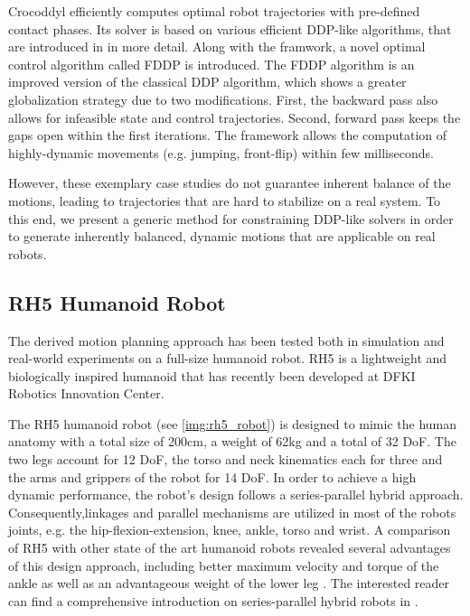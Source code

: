 Crocoddyl efficiently computes optimal robot trajectories with pre-defined contact phases. Its solver is based on various efficient \gls{DDP}-like algorithms, that are introduced in  in more detail. Along with the framwork, a novel optimal control algorithm called \gls{FDDP} is introduced. The \gls{FDDP} algorithm is an improved version of the classical \gls{DDP} algorithm, which shows a greater globalization strategy due to two modifications. First, the backward pass also allows for infeasible state and control trajectories. Second, forward pass keeps the gaps open within the first iterations. The framework allows the computation of highly-dynamic movements (e.g. jumping, front-flip) within few milliseconds. 

However, these exemplary case studies do not guarantee inherent balance of the motions, leading to trajectories that are hard to stabilize on a real system. To this end, we present a generic method for constraining DDP-like solvers in order to generate inherently balanced, dynamic motions that are applicable on real robots. 

\subsection{RH5 Humanoid Robot}
The derived motion planning approach has been tested both in simulation and real-world experiments on a full-size humanoid robot. RH5 is a lightweight and biologically inspired humanoid that has recently been developed at DFKI Robotics Innovation Center\cite{peters2017konstruktion}.

The RH5 humanoid robot (see \cref{img:rh5_robot}) is designed to mimic the human anatomy with a total size of 200cm, a weight of 62kg and a total of 32 \gls{DoF}. The two legs account for 12 \gls{DoF}, the torso and neck kinematics each for three and the arms and grippers of the robot for 14 \gls{DoF}. In order to achieve a high dynamic performance, the robot's design follows a series-parallel hybrid approach. Consequently,linkages and parallel mechanisms are utilized in most of the robots joints, e.g. the hip-flexion-extension, knee, ankle, torso and wrist. A comparison of RH5 with other state of the art humanoid robots revealed several advantages of this design approach, including better maximum velocity and torque of the ankle as well as an advantageous weight of the lower leg \cite{kumar2020survey}. The interested reader can find a comprehensive introduction on series-parallel hybrid robots in \cite[Ch.2]{kumar2019modular}. 

